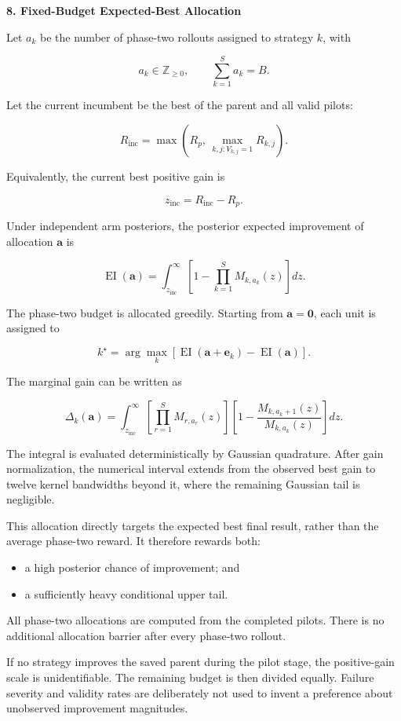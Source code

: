 \documentclass[
]{article}
\providecommand{\tightlist}{%
  \setlength{\itemsep}{0pt}\setlength{\parskip}{0pt}}
\begin{document}
\textbf{8. Fixed-Budget Expected-Best Allocation}

Let \(a_k\) be the number of phase-two rollouts assigned to strategy
\(k\), with

\[
a_k\in\mathbb{Z}_{\ge 0},
\qquad
\sum_{k=1}^{S}a_k=B.
\]

Let the current incumbent be the best of the parent and all valid
pilots:

\[
R_{\mathrm{inc}}
=
\max\!\left(
R_p,\,
\max_{k,j:V_{k,j}=1} R_{k,j}
\right).
\]

Equivalently, the current best positive gain is

\[
z_{\mathrm{inc}}=R_{\mathrm{inc}}-R_p.
\]

Under independent arm posteriors, the posterior expected improvement of
allocation \(\mathbf a\) is

\[
\operatorname{EI}(\mathbf a)
=
\int_{z_{\mathrm{inc}}}^{\infty}
\left[
1-
\prod_{k=1}^{S}
M_{k,a_k}(z)
\right]dz.
\]

The phase-two budget is allocated greedily. Starting from
\(\mathbf a=\mathbf 0\), each unit is assigned to

\[
k^\star
=
\arg\max_k
\left[
\operatorname{EI}(\mathbf a+\mathbf e_k)
-
\operatorname{EI}(\mathbf a)
\right].
\]

The marginal gain can be written as

\[
\Delta_k(\mathbf a)
=
\int_{z_{\mathrm{inc}}}^{\infty}
\left[
\prod_{r=1}^{S}M_{r,a_r}(z)
\right]
\left[
1-
\frac{M_{k,a_k+1}(z)}
{M_{k,a_k}(z)}
\right]dz.
\]

The integral is evaluated deterministically by Gaussian quadrature.
After gain normalization, the numerical interval extends from the
observed best gain to twelve kernel bandwidths beyond it, where the
remaining Gaussian tail is negligible.

This allocation directly targets the expected best final result, rather
than the average phase-two reward. It therefore rewards both:

\begin{itemize}
\tightlist
\item
  a high posterior chance of improvement; and
\item
  a sufficiently heavy conditional upper tail.
\end{itemize}

All phase-two allocations are computed from the completed pilots. There
is no additional allocation barrier after every phase-two rollout.

If no strategy improves the saved parent during the pilot stage, the
positive-gain scale is unidentifiable. The remaining budget is then
divided equally. Failure severity and validity rates are deliberately
not used to invent a preference about unobserved improvement magnitudes.
\end{document}
